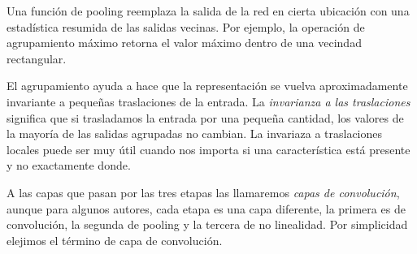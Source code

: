 \begin{remark}
Una función de pooling reemplaza la salida de la red en cierta
ubicación con una estadística resumida de las salidas vecinas.
Por ejemplo, la operación de agrupamiento máximo
retorna el valor máximo dentro de una vecindad rectangular.
\end{remark}


El agrupamiento ayuda a hace que la representación se vuelva 
aproximadamente invariante a pequeñas traslaciones de
la entrada. La \textit{invarianza a las traslaciones} significa 
que si trasladamos la entrada por una pequeña cantidad, los
valores de la mayoría de las salidas agrupadas no cambian.
La invariaza a traslaciones locales puede ser muy útil cuando
nos importa si una característica está presente y no 
exactamente donde.

A las capas que pasan por las tres etapas las llamaremos \textit{capas
de convolución}, aunque para algunos autores, cada etapa es una capa
diferente, la primera es de convolución, la segunda de pooling y la 
tercera de no linealidad. Por simplicidad elejimos el término
de capa de convolución.







